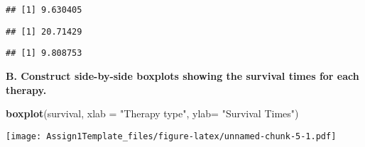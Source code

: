\documentclass[]{article}
\newenvironment{Shaded}{\begin{snugshade}}{\end{snugshade}}
\newcommand{\CommentTok}[1]{\textcolor[rgb]{0.56,0.35,0.01}{\textit{#1}}}
\newcommand{\DataTypeTok}[1]{\textcolor[rgb]{0.13,0.29,0.53}{#1}}
\newcommand{\KeywordTok}[1]{\textcolor[rgb]{0.13,0.29,0.53}{\textbf{#1}}}
\newcommand{\NormalTok}[1]{#1}
\newcommand{\OperatorTok}[1]{\textcolor[rgb]{0.81,0.36,0.00}{\textbf{#1}}}
\newcommand{\StringTok}[1]{\textcolor[rgb]{0.31,0.60,0.02}{#1}}
\begin{document}
\begin{Shaded}
\end{Shaded}

\begin{verbatim}
## [1] 9.630405
\end{verbatim}

\begin{Shaded}
\end{Shaded}

\begin{verbatim}
## [1] 20.71429
\end{verbatim}

\begin{Shaded}
\end{Shaded}

\begin{verbatim}
## [1] 9.808753
\end{verbatim}

\textbf{B. Construct side-by-side boxplots showing the survival times
for each therapy.}

\begin{Shaded}
\begin{Highlighting}[]
\KeywordTok{boxplot}\NormalTok{(survival, }\DataTypeTok{xlab =} \StringTok{"Therapy type"}\NormalTok{, }\DataTypeTok{ylab=} \StringTok{"Survival Times"}\NormalTok{)}
\end{Highlighting}
\end{Shaded}

\texttt{[image: Assign1Template\_files/figure-latex/unnamed-chunk-5-1.pdf]}
\end{document}
